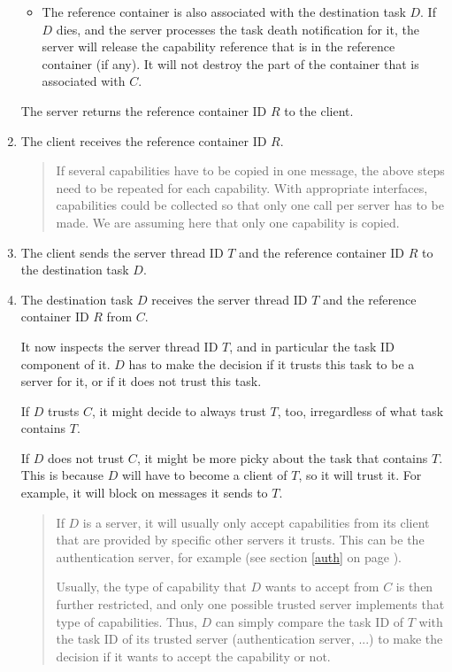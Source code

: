 \documentclass[9pt,a4paper]{extarticle}
\newenvironment{comment}{\footnotesize \begin{quote}}{\end{quote}}
\begin{document}
\begin{enumerate}
\begin{itemize}
  \item The reference container is also associated with the
    destination task $D$.  If $D$ dies, and the server processes the
    task death notification for it, the server will release the
    capability reference that is in the reference container (if any).
    It will not destroy the part of the container that is associated
    with $C$.
  \end{itemize}

  The server returns the reference container ID $R$ to the client.

\item The client receives the reference container ID $R$.

  \begin{comment}
    If several capabilities have to be copied in one message, the
    above steps need to be repeated for each capability.  With
    appropriate interfaces, capabilities could be collected so that
    only one call per server has to be made.  We are assuming here
    that only one capability is copied.
  \end{comment}

\item The client sends the server thread ID $T$ and the reference
  container ID $R$ to the destination task $D$.
  
\item The destination task $D$ receives the server thread ID $T$ and
  the reference container ID $R$ from $C$.
  
  It now inspects the server thread ID $T$, and in particular the task
  ID component of it.  $D$ has to make the decision if it trusts this
  task to be a server for it, or if it does not trust this task.
  
  If $D$ trusts $C$, it might decide to always trust $T$, too,
  irregardless of what task contains $T$.
  
  If $D$ does not trust $C$, it might be more picky about the task
  that contains $T$.  This is because $D$ will have to become a client
  of $T$, so it will trust it.  For example, it will block on messages
  it sends to $T$.

  \begin{comment}
    If $D$ is a server, it will usually only accept capabilities from
    its client that are provided by specific other servers it trusts.
    This can be the authentication server, for example (see section
    \ref{auth} on page \pageref{auth}).
    
    Usually, the type of capability that $D$ wants to accept from $C$
    is then further restricted, and only one possible trusted server
    implements that type of capabilities.  Thus, $D$ can simply
    compare the task ID of $T$ with the task ID of its trusted server
    (authentication server, ...) to make the decision if it wants to
    accept the capability or not.
  \end{comment}
  

\end{enumerate}
\end{document}

